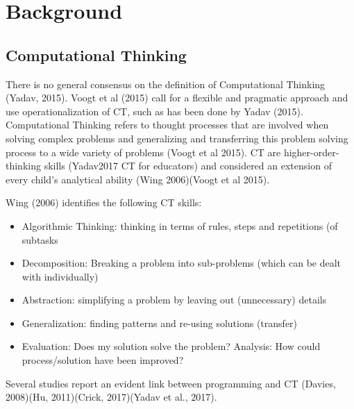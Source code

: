 
\section{Background}\label{sec:background}
%
%
%





\subsection{Computational Thinking}

There is no general consensus on the definition of Computational Thinking (Yadav, 2015). Voogt et al (2015) call for a flexible and pragmatic approach and use operationalization of CT, such as has been done by Yadav (2015). Computational Thinking refers to thought processes that are involved when solving complex problems and generalizing and transferring this problem solving process to a wide variety of problems (Voogt et al 2015). CT are higher-order-thinking skills  (Yadav2017 CT for educators) and considered an extension of every child's analytical ability (Wing 2006)(Voogt et al 2015).


Wing (2006) identifies the following CT skills:\label{CTdefWing}
\begin{itemize}
\item Algorithmic Thinking: thinking in terms of rules, steps and repetitions (of subtasks
\item Decomposition: Breaking a problem into sub-problems (which can be dealt with individually)
\item Abstraction: simplifying a problem by leaving out (unnecessary) details
\item Generalization: finding patterns and re-using solutions (transfer)
\item Evaluation: Does my solution solve the problem? Analysis: How could process/solution have been improved?
\end{itemize}





Several studies report an evident link between programming and CT (Davies, 2008)(Hu, 2011)(Crick, 2017)(Yadav et al., 2017).




